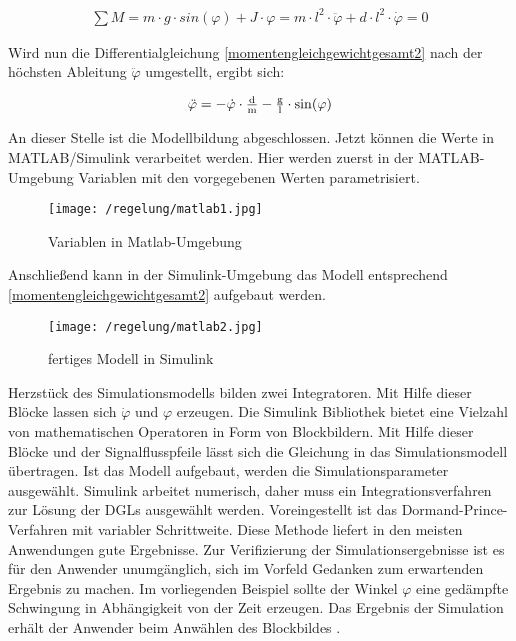 \begin{align}
	\sum M = m \cdot g \cdot \si{sin}(\varphi) + J \cdot \varphi = m \cdot l^{2} \cdot \ddot\varphi + d \cdot l^{2} \cdot \dot\varphi = 0
	\label{momentengleichgewichtgesamt2} 
\end{align}

Wird nun die Differentialgleichung \ref{momentengleichgewichtgesamt2} nach der höchsten Ableitung $\ddot\varphi$ umgestellt, ergibt sich:

\begin{align}
	\ddot\varphi = -\dot\varphi \cdot \tfrac{\i{d}}{\i{m}} - \tfrac{\i{g}}{\i{l}} \cdot \si{sin}(\varphi)
	\label{diffgleichung} 
\end{align}

An dieser Stelle ist die Modellbildung abgeschlossen. Jetzt können die Werte in MATLAB/Simulink  verarbeitet werden.
Hier werden zuerst in der MATLAB-Umgebung Variablen mit den vorgegebenen Werten parametrisiert.

\begin{figure}[h]
	\centering
	\texttt{[image: /regelung/matlab1.jpg]}
	\label{fig:matlab1}
	\caption{Variablen in Matlab-Umgebung}
\end{figure}

Anschließend kann in der Simulink-Umgebung das Modell entsprechend \ref{momentengleichgewichtgesamt2} aufgebaut werden.

\begin{figure}[h]
	\centering
	\texttt{[image: /regelung/matlab2.jpg]}
	\label{fig:matlab2}
	\caption{fertiges Modell in Simulink}
\end{figure}

Herzstück des Simulationsmodells bilden zwei Integratoren.
Mit Hilfe dieser Blöcke lassen sich  $\dot{\varphi}$ und $\varphi$ erzeugen.
Die Simulink Bibliothek bietet eine Vielzahl von mathematischen Operatoren in Form von Blockbildern.
Mit Hilfe dieser Blöcke und der Signalflusspfeile lässt sich die Gleichung in das Simulationsmodell übertragen.
Ist das Modell aufgebaut, werden die Simulationsparameter ausgewählt. 
Simulink arbeitet numerisch, daher muss ein Integrationsverfahren zur Lösung der DGLs ausgewählt werden. Voreingestellt ist das Dormand-Prince-Verfahren mit variabler Schrittweite.
Diese Methode liefert in den meisten Anwendungen gute Ergebnisse. \autocite[S.~6]{scherf2010}
Zur Verifizierung der Simulationsergebnisse ist es für den Anwender unumgänglich, sich im Vorfeld Gedanken zum erwartenden Ergebnis zu machen.
Im vorliegenden Beispiel sollte der Winkel $\varphi$ eine gedämpfte Schwingung in Abhängigkeit von der Zeit erzeugen.
Das Ergebnis der Simulation erhält der Anwender beim Anwählen des Blockbildes \grqq.

